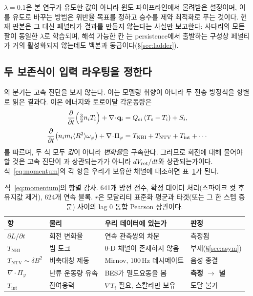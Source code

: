 \documentclass[10pt,a4paper]{article}
\begin{document}
$\lambda=0.1$은 본 연구가 유도한 값이 아니라 윈도 파이프라인에서 물려받은
설정이며, 이를 유도로 바꾸는 방법은 위반율 목표를 정하고 승수를 제약 최적화로
푸는 것이다. 현재 판본은 그 대신 페널티가 결과를 만들지 않는다는 사실만
보고한다: 사다리의 모든 팔이 동일한 $\lambda$로 학습되며, 해석 가능한 칸
\bthree{}는 persistence에서 출발하는 구성상 페널티가 거의 활성화되지 않는데도
백본과 동급이다(\S\ref{sec:ladder}).

\subsection{두 보존식이 입력 라우팅을 정한다}
\label{sec:model:physics}

\seqv{}의 \Vrot{} 분기는 고속 진단을 보지 않는다. 이는 모델링 취향이 아니라
두 전송 방정식을 항별로 읽은 결과다. 이온 에너지와 토로이달 각운동량은
%
\begin{align}
  \frac{\partial}{\partial t}\Bigl(\tfrac{3}{2}n_i T_i\Bigr) + \nabla\!\cdot\!\mathbf{q}_i
    &= Q_{ei}\,(T_e-T_i) + S_i,
  \label{eq:energy}\\[2pt]
  \frac{\partial}{\partial t}\bigl(n_i m_i \langle R^2\rangle \omega_\varphi\bigr)
    + \nabla\!\cdot\!\Pi_\varphi
    &= T_\mathrm{NBI} + T_\mathrm{NTV} + T_\mathrm{int} + \cdots
  \label{eq:momentum}
\end{align}
%
를 따르며, 두 식 모두 \emph{값}이 아니라 \emph{변화율}을 구속한다. 그러므로
회전에 대해 물어야 할 것은 고속 진단이 \Vrot{}과 상관되는가가 아니라
$dV_\mathrm{rot}/dt$와 상관되는가이다. 식~\eqref{eq:momentum}의 각 항을 우리가 보유한
채널에 대조하면 표~\ref{tab:torque}가 된다.

\begin{table}[t]
  \centering
  \caption{식~\eqref{eq:momentum}의 항별 감사. 641개 방전 전수, 확정 데이터
  처리(스파이크 컷 후 유지값 제거), 624개 연속 블록. $r$은 모달리티 표준화 평균과
  타겟(또는 그 한 스텝 증분) 사이의 lag 0 통합 Pearson 상관이다.}
  \label{tab:torque}
  \small
  \begin{tabular}{llll}
    \toprule
    항 & 물리 & 우리 데이터에 있는가 & 판정 \\
    \midrule
    $\partial L/\partial t$ & 회전 변화율 & 연속 관측쌍의 차분 & 측정됨 \\
    $T_\mathrm{NBI}$ & 빔 토크 & 0-D 채널이 존재하지 않음 & 부재(\S\ref{sec:asym}) \\
    $T_\mathrm{NTV}\sim\delta B^2$ & 비축대칭 제동 & Mirnov, 100\,Hz 데시메이트 & 음성 종결 \\
    $\nabla\!\cdot\!\Pi_\varphi$ & 난류 운동량 유속 & BES가 밀도요동을 봄 & \textbf{측정 $\rightarrow$ 널} \\
    $T_\mathrm{int}$ & 잔여응력 & $\nabla T_i$ 필요, 스칼라만 보유 & 도달 불가 \\
    \bottomrule
  \end{tabular}
\end{table}
\end{document}
